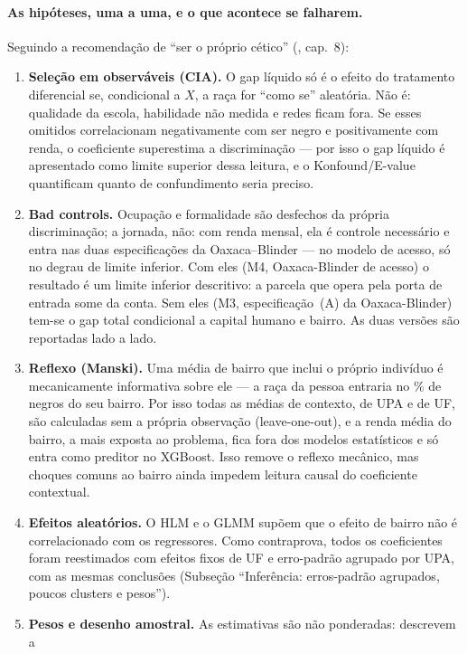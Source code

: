 \documentclass[11pt, a4paper, oneside]{article}
\begin{document}
\paragraph{As hipóteses, uma a uma, e o que acontece se falharem.}
Seguindo a recomendação de ``ser o próprio cético'' (, cap.~8):
\begin{enumerate}
  \item \textbf{Seleção em observáveis (CIA).} O gap líquido só é o efeito do tratamento
    diferencial se, condicional a $X$, a raça for ``como se'' aleatória. Não é: qualidade
    da escola, habilidade não medida e redes ficam fora. Se esses omitidos correlacionam
    negativamente com ser negro e positivamente com renda, o coeficiente {superestima}
    a discriminação --- por isso o gap líquido é apresentado como limite superior dessa
    leitura, e o Konfound/E-value quantificam quanto de confundimento seria preciso.
  \item \textbf{{Bad controls}.} Ocupação e formalidade são desfechos da
    própria discriminação; a jornada, não: com renda mensal, ela é controle necessário
    e entra nas duas especificações da Oaxaca--Blinder --- no modelo de acesso, só no
    degrau de limite inferior. Com eles (M4, Oaxaca-Blinder de acesso) o resultado é um
    {limite inferior descritivo}: a parcela que opera pela porta de entrada some da
    conta. Sem eles (M3, especificação~(A) da Oaxaca-Blinder) tem-se o gap total
    condicional a capital humano e bairro. As duas versões são reportadas lado a lado.
  \item \textbf{Reflexo (Manski).} Uma média de bairro que inclui o próprio indivíduo é
    mecanicamente informativa sobre ele --- a raça da pessoa entraria no \% de negros do
    seu bairro. Por isso todas as médias de contexto, de UPA e de UF, são calculadas sem a
    própria observação ({leave-one-out}), e a renda média do bairro, a mais exposta ao
    problema, fica fora dos modelos estatísticos e só entra como preditor no XGBoost. Isso remove o reflexo mecânico, mas choques
    comuns ao bairro ainda impedem leitura causal do coeficiente contextual.
  \item \textbf{Efeitos aleatórios.} O HLM e o GLMM supõem que o efeito de bairro não é
    correlacionado com os regressores. Como contraprova, todos os coeficientes foram
    reestimados com efeitos fixos de UF e erro-padrão agrupado por UPA, com as mesmas
    conclusões (Subseção ``Inferência: erros-padrão agrupados, poucos clusters e pesos'').
  \item \textbf{Pesos e desenho amostral.} As estimativas são não ponderadas: descrevem a

\end{enumerate}
\end{document}
